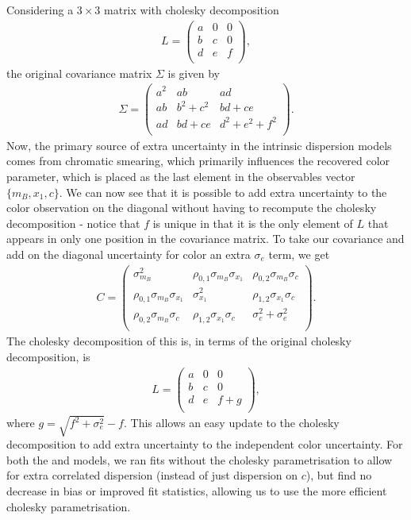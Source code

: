 \documentclass[a4paper,fleqn,usenatbib]{mnras}
\newcommand{\gten}{\citetalias{Guy2010}}
\newcommand{\celeven}{\citetalias{Chotard2011}}
\begin{document}
Considering a $3\times3$ matrix with cholesky decomposition
\begin{align}
L = \begin{pmatrix}
a & 0 & 0 \\ b & c & 0 \\ d & e & f \\
\end{pmatrix},
\end{align}
the original covariance matrix $\Sigma$ is given by
\begin{align}
\Sigma = \begin{pmatrix}
a^2 & ab & ad \\ ab & b^2 + c^2 & bd + ce \\ ad & bd + ce & d^2 + e^2 + f^2\\
\end{pmatrix}.
\end{align}
Now, the primary source of extra uncertainty in the intrinsic dispersion models comes from chromatic smearing, which primarily influences the recovered color parameter, which is placed as the last element in the observables vector $\lbrace m_B, x_1, c\rbrace$. We can now see that it is possible to add extra uncertainty to the color observation on the diagonal without having to recompute the cholesky decomposition - notice that $f$ is unique in that it is the only element of $L$ that appears in only one position in the covariance matrix. To take our covariance and add on the diagonal uncertainty for color an extra $\sigma_e$ term, we get
\begin{align}
C = \begin{pmatrix}
\sigma_{m_B}^2 & \rho_{0,1} \sigma_{m_B} \sigma_{x_1} & \rho_{0,2} \sigma_{m_B} \sigma_c \\
\rho_{0,1} \sigma_{m_B} \sigma_{x_1} & \sigma_{x_1}^2 & \rho_{1, 2} \sigma_{x_1} \sigma_c \\
\rho_{0,2} \sigma_{m_B} \sigma_c & \rho_{1, 2} \sigma_{x_1} \sigma_c &  \sigma_c^2 + \sigma_e^2 \\
\end{pmatrix}.
\end{align}
The cholesky decomposition of this is, in terms of the original cholesky decomposition, is
\begin{align}
L = \begin{pmatrix}
a & 0 & 0 \\ b & c & 0 \\ d & e & f + g \\
\end{pmatrix},
\end{align}
where $g = \sqrt{f^2 + \sigma_e^2} - f$. This allows an easy update to the cholesky decomposition to add extra uncertainty to the independent color uncertainty. For both the {\gten} and {\celeven} models, we ran fits without the cholesky parametrisation to allow for extra correlated dispersion (instead of just dispersion on $c$), but find no decrease in bias or improved fit statistics, allowing us to use the more efficient cholesky parametrisation.





\bsp	%
\label{lastpage}
\end{document}
